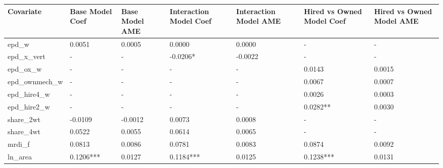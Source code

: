 \begin{tabular}{lllllll}
\toprule
 Covariate     & Base Model Coef   & Base Model AME   & Interaction Model Coef   & Interaction Model AME   & Hired vs Owned Model Coef   & Hired vs Owned Model AME   \\
\midrule
 epd\_w         & 0.0051            & 0.0005           & 0.0000                   & 0.0000                  & -                           & -                          \\
 epd\_x\_vert    & -                 & -                & -0.0206*                 & -0.0022                 & -                           & -                          \\
 epd\_ox\_w      & -                 & -                & -                        & -                       & 0.0143                      & 0.0015                     \\
 epd\_ownmech\_w & -                 & -                & -                        & -                       & 0.0067                      & 0.0007                     \\
 epd\_hire4\_w   & -                 & -                & -                        & -                       & 0.0026                      & 0.0003                     \\
 epd\_hire2\_w   & -                 & -                & -                        & -                       & 0.0282**                    & 0.0030                     \\
 share\_2wt     & -0.0109           & -0.0012          & 0.0073                   & 0.0008                  & -                           & -                          \\
 share\_4wt     & 0.0522            & 0.0055           & 0.0614                   & 0.0065                  & -                           & -                          \\
 mrdi\_f        & 0.0813            & 0.0086           & 0.0781                   & 0.0083                  & 0.0874                      & 0.0092                     \\
 ln\_area       & 0.1206***         & 0.0127           & 0.1184***                & 0.0125                  & 0.1238***                   & 0.0131                     \\
\bottomrule
\end{tabular}
